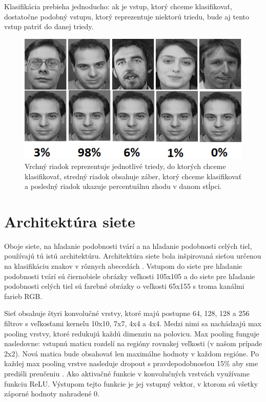 Klasifikácia prebieha jednoducho: ak je vstup, ktorý chceme klasifikovať, dostatočne podobný vstupu, ktorý reprezentuje niektorú triedu, bude aj tento vstup patriť do danej triedy.

\begin{figure}[H]
\centerline{\includegraphics[width=1\textwidth]{images/oneshot_classification}}
\caption[Klasifikácia pomocou siamskej neurónovej siete]{Vrchný riadok reprezentuje jednotlivé triedy, do ktorých chceme klasifikovať, stredný riadok obsahuje záber, ktorý chceme klasifikovať a posledný riadok ukazuje percentuálnu zhodu v danom stĺpci.}
\label{obr:oneshot_classification}
\end{figure}

\section{Architektúra siete} \label{kap:siamese_architecture}
Oboje siete, na hľadanie podobnosti tvárí a na hľadanie podobnosti celých tiel, používajú tú istú architektúru.
Architektúra siete bola inšpirovaná sieťou určenou na klasifikáciu znakov v rôznych abecedách \cite{siamese_architecture}.
Vstupom do siete pre hľadanie podobnosti tvárí sú čiernobiele obrázky veľkosti 105x105 a 
do siete pre hľadanie podobnosti celých tiel sú farebné obrázky o veľkosti 65x155 s troma kanálmi farieb RGB.

Sieť obsahuje štyri konvolučné vrstvy, ktoré majú postupne 64, 128, 128 a 256 filtrov s veľkosťami kernelu 10x10, 7x7, 4x4 a 4x4.
Medzi nimi sa nachádzajú max pooling vrstvy, ktoré redukujú každú dimenziu na polovicu.
Max pooling funguje nasledovne: vstupnú maticu rozdelí na regióny rovnakej veľkosti (v našom prípade 2x2). 
Nová matica bude obsahovať len maximálne hodnoty v každom regióne.
Po každej max pooling vrstve nasleduje dropout s pravdepodobnosťou 15\% aby sme predišli preučeniu \cite{JMLR:v15:srivastava14a}. 
Ako aktivačné funkcie v konvolučných vrstvách využívame funkciu ReLU. 
Výstupom tejto funkcie je jej vstupný vektor, v ktorom sú všetky záporné hodnoty nahradené 0.

